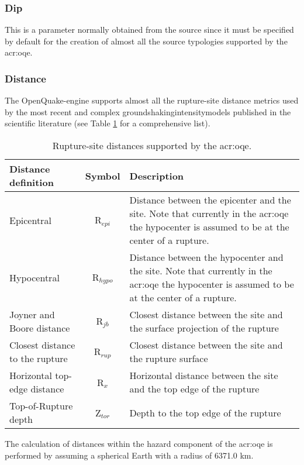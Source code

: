 \subsubsection{Dip}
This is a parameter normally obtained from the source since it must be specified
by default for the creation of almost all the source typologies supported by the
\gls{acr:oqe}. 
%
\subsubsection{Distance}
%
The OpenQuake-engine supports almost all the rupture-site 
distance metrics used by the most recent and complex 
\glspl{groundshakingintensitymodel} published in the scientific 
literature (see Table \ref{tab:distances} for a comprehensive list).
\begin{table}[!t]
\centering
\caption{Rupture-site distances supported by the \gls{acr:oqe}.}
\begin{tabular}{|p{4.5cm}cp{7.5cm}|}
\hline
\rowcolor{anti-flashwhite}
\bf{Distance definition} & \bf{Symbol} & \bf{Description} \\
\hline 
Epicentral & R$_{epi}$ & Distance between the epicenter and the site. 
                         Note that currently in the \gls{acr:oqe} the 
                         hypocenter is assumed to be at the center of 
                         a rupture.\\
Hypocentral & R$_{hypo}$ & Distance between the hypocenter and the site. 
                           Note that currently in the \gls{acr:oqe} the 
                           hypocenter is assumed to be at the center of 
                           a rupture.\\
Joyner and Boore distance & R$_{jb}$ & Closest distance between the site and 
                                       the surface projection of the rupture \\
Closest distance to the rupture & R$_{rup}$ & Closest distance between 
                                              the site and the rupture 
                                              surface \\
Horizontal top-edge distance & R$_{x}$ & Horizontal distance between the site 
                                         and the top edge of the rupture \\
Top-of-Rupture depth & Z$_{tor}$ & Depth to the top edge of the rupture \\
\hline
\end{tabular}
\label{tab:distances}
\end{table}
The calculation of distances within the hazard component of the \gls{acr:oqe} 
is performed by assuming a spherical Earth with a radius of 6371.0 km. 

